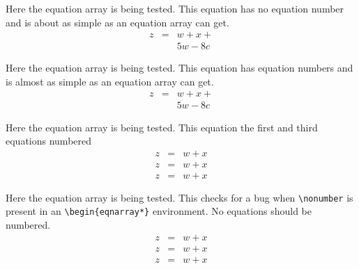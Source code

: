 \documentclass{article}
\begin{document}
Here the equation array is being tested.  This equation has no equation number
and is about as simple as an equation array can get.
\begin{eqnarray*}
z & = & w + x + \\
  &   & 5w - 8c 
\end{eqnarray*}

Here the equation array is being tested.  This equation has equation numbers
and is almost as simple as an equation array can get.
\begin{eqnarray}
z & = & w + x + \\
  &   & 5w - 8c 
\end{eqnarray}

Here the equation array is being tested.  This equation the first and third equations numbered
\begin{eqnarray}
z & = & w + x  \\
z & = & w + x \nonumber\\
z & = & w + x  
\end{eqnarray}

Here the equation array is being tested.  This checks for a bug when 
\verb#\nonumber# is present in an \verb#\begin{eqnarray*}# environment.  
No equations should be numbered.
\begin{eqnarray*}
z & = & w + x  \\
z & = & w + x \nonumber\\
z & = & w + x  
\end{eqnarray*}
\end{document}
